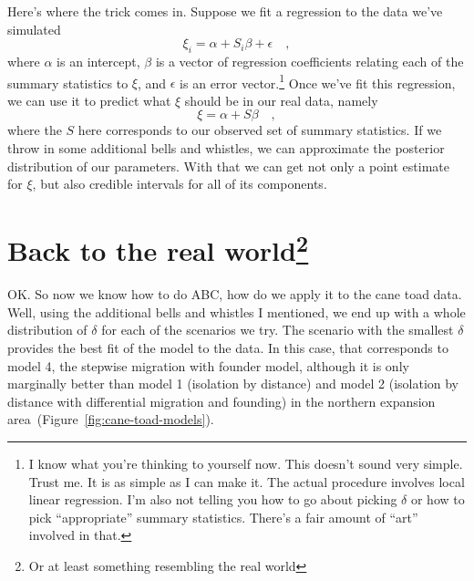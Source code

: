 \documentclass[12pt]{article}
\begin{document}
Here's where the trick comes in. Suppose we fit a regression to the
data we've simulated
\[
\xi_i = \alpha + S_i\beta + \epsilon \quad ,
\]
where $\alpha$ is an intercept, $\beta$ is a vector of regression
coefficients relating each of the summary statistics to $\xi$, and
$\epsilon$ is an error vector.\footnote{I know what you're thinking to
  yourself now. This doesn't sound very simple. Trust me. It is as
  simple as I can make it. The actual procedure involves local linear
  regression. I'm also not telling you how to go about picking
  $\delta$ or how to pick ``appropriate'' summary statistics. There's
  a fair amount of ``art'' involved in that.} Once we've fit this
regression, we can use it to predict what $\xi$ should be in our real
data, namely
\[
\xi = \alpha + S\beta \quad ,
\]
where the $S$ here corresponds to our observed set of summary
statistics. If we throw in some additional bells and whistles, we can
approximate the posterior distribution of our parameters. With that we
can get not only a point estimate for $\xi$, but also credible
intervals for all of its components.

\section*{Back to the real world\footnote{Or at least something
    resembling the real world}}

OK. So now we know how to do ABC, how do we apply it to the cane toad
data. Well, using the additional bells and whistles I mentioned, we
end up with a whole distribution of $\delta$ for each of the scenarios
we try. The scenario with the smallest $\delta$ provides the best fit
of the model to the data. In this case, that corresponds to model 4,
the stepwise migration with founder model, although it is only
marginally better than model 1 (isolation by distance) and model 2
(isolation by distance with differential migration and founding) in
the northern expansion area~(Figure~\ref{fig:cane-toad-models}).
\end{document}
